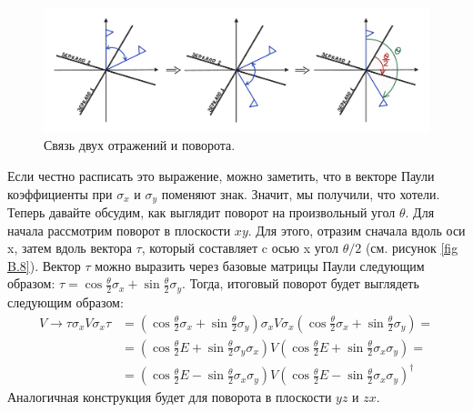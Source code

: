 \begin{figure}[h!]
\centering
\includegraphics[scale=0.3]{appendix/images/reflections and turn.png}
\caption{Связь двух отражений и поворота.}
\label{fig B.7}
\end{figure}

Если честно расписать это выражение, можно заметить, что в векторе Паули коэффициенты при $\sigma_x$ и $\sigma_y$ поменяют знак. Значит, мы получили, что хотели. Теперь давайте обсудим, как выглядит поворот на произвольный угол $\theta$. Для начала рассмотрим поворот в плоскости $xy$. Для этого, отразим сначала вдоль оси x, затем вдоль вектора $\tau$, который составляет c осью x угол $\theta/2$ (см. рисунок \ref{fig B.8}). Вектор $\tau$ можно выразить через базовые матрицы Паули следующим образом: $\tau = \cos\frac{\theta}{2}\sigma_x + \sin\frac{\theta}{2}\sigma_y$. Тогда, итоговый поворот будет выглядеть следующим образом:
\begin{align*}
    V \rightarrow \tau \sigma_x V \sigma_x \tau &= \left(\cos\frac{\theta}{2}\sigma_x + \sin\frac{\theta}{2}\sigma_y\right)\sigma_x V \sigma_x \left(\cos\frac{\theta}{2}\sigma_x + \sin\frac{\theta}{2}\sigma_y\right) = \\
    & = \left(\cos\frac{\theta}{2}E + \sin\frac{\theta}{2}\sigma_y\sigma_x\right)V\left(\cos\frac{\theta}{2}E + \sin\frac{\theta}{2}\sigma_x\sigma_y\right) = \\
    & = \left(\cos\frac{\theta}{2}E - \sin\frac{\theta}{2}\sigma_x\sigma_y\right)V\left(\cos\frac{\theta}{2}E - \sin\frac{\theta}{2}\sigma_x\sigma_y\right)^{\dagger}
\end{align*}
Аналогичная конструкция будет для поворота в плоскости $yz$ и $zx$.
